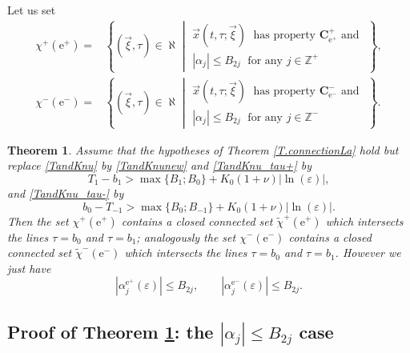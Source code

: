 \documentclass[10pt]{article}
\numberwithin{equation}{section}
\def\al{\alpha}
\def\ep{\varepsilon}
\def\Z{{\mathbb Z}}
\def\ee{{\mathrm e}}
\def\xxi{\vec{\xi}}
\def\x{\vec{x}}
\newcommand\bs[1]{{\boldsymbol{#1}}}
\newtheorem{theorem}{Theorem}[section]
\theoremstyle{definition}
\theoremstyle{remark}
\begin{document}
Let us set
\begin{equation}\label{defX+}
\begin{split}
\chi^+(\ee^+)=& \left\{ (\xxi,\tau) \in \aleph \middle|  \begin{array}{l}
                                      \x(t,\tau ; \xxi) \; \textrm{ has property $\bs{C^+_{\ee^+}}$ and } \\
                                      |\alpha_j| \le  B_{2j}  \; \textrm{ for any $j \in \Z^+$}
                                    \end{array}  \right\},\\
\chi^-(\ee^-)= & \left\{ (\xxi,\tau) \in \aleph  \middle|  \begin{array}{l}
                                      \x(t,\tau ; \xxi) \; \textrm{ has property $\bs{C^-_{\ee^-}}$ and } \\
                                     |\alpha_j| \le   B_{2j}  \; \textrm{ for any $j \in \Z^-$}
                                    \end{array}  \right\} .
    \end{split}
\end{equation}
\begin{theorem}\label{T.connection}
   Assume that the hypotheses of Theorem \ref{T.connectionLa} hold  but
replace \eqref{TandKnu}  by \eqref{TandKnunew}  and   \eqref{TandKnu_tau+} by
\begin{equation}\label{TandKnunew_tau+}
	T_1-b_1 >  \max\{  B_{1}; B_{0}   \} + K_0(1+\nu)   |\ln(\ep)| , %
\end{equation}
and \eqref{TandKnu_tau-} by
	\begin{equation}\label{TandKnunew_tau-}
		b_0-T_{-1} >  \max\{  B_{0}; B_{-1}   \} + K_0(1+\nu)   |\ln(\ep)| . %
\end{equation}
Then the set $\chi^+(\ee^+)$  contains a closed connected set $\tilde{\chi}^+(\ee^+)$
which intersects the lines $\tau=b_0$ and $\tau=b_1$; analogously
 the set $\chi^-(\ee^-)$  contains a closed connected set $\tilde{\chi}^-(\ee^-)$
which intersects the lines $\tau=b_0$ and $\tau=b_1$. However
 we just have
     $$|\al_{j}^{\ee^+}(\ep)| \le B_{2j}, \qquad |\al_{j}^{\ee^-}(\ep)| \le B_{2j}.$$
\end{theorem}




\subsection{Proof of Theorem \ref{T.connection}: the $|\alpha_j|\le B_{2j}$ case}\label{S.theorem2.1}
\end{document}
